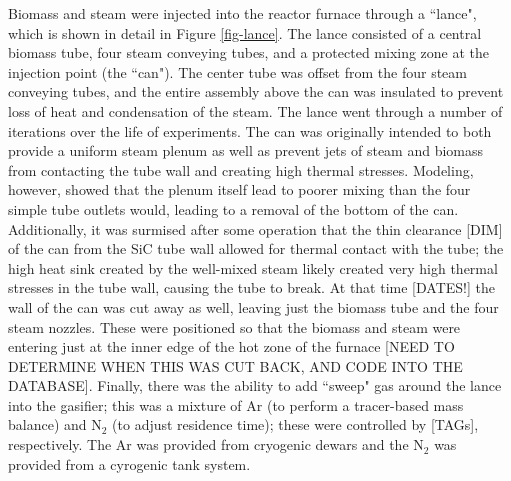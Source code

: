 \documentclass[11pt,twocolumn]{article}
\begin{document}
Biomass and steam were injected into the reactor furnace through a ``lance", which is shown in detail in Figure \ref{fig-lance}. The lance consisted of a central biomass tube, four steam conveying tubes, and a protected mixing zone at the injection point (the ``can").  The center tube was offset from the four steam conveying tubes, and the entire assembly above the can was insulated to prevent loss of heat and condensation of the steam.  The lance went through a number of iterations over the life of experiments.  The can was originally intended to both provide a uniform steam plenum as well as prevent jets of steam and biomass from contacting the tube wall and creating high thermal stresses.  Modeling, however, showed that the plenum itself lead to poorer mixing than the four simple tube outlets would, leading to a removal of the bottom of the can.  Additionally, it was surmised after some operation that the thin clearance [DIM] of the can from the SiC tube wall allowed for thermal contact with the tube; the high heat sink created by the well-mixed steam likely created very high thermal stresses in the tube wall, causing the tube to break.  At that time [DATES!] the wall of the can was cut away as well, leaving just the biomass tube and the four steam nozzles.  These were positioned so that the biomass and steam were entering just at the inner edge of the hot zone of the furnace [NEED TO DETERMINE WHEN THIS WAS CUT BACK, AND CODE INTO THE DATABASE].  Finally, there was the ability to add ``sweep" gas around the lance into the gasifier; this was a mixture of Ar (to perform a tracer-based mass balance) and N$_2$ (to adjust residence time); these were controlled by [TAGs], respectively.  The Ar was provided from cryogenic dewars and the N$_2$ was provided from a cyrogenic tank system.
\end{document}
